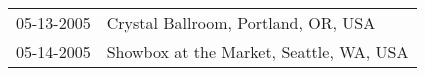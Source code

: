 \begin{supertabular}{ll}
 05-13-2005 &      Crystal Ballroom, Portland, OR, USA \\
 05-14-2005 &  Showbox at the Market, Seattle, WA, USA \\
\end{supertabular}
